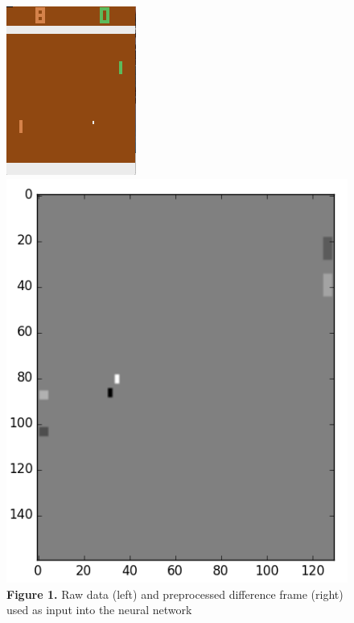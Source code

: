 \documentclass[12pt]{article}
\theoremstyle{plain}
\theoremstyle{definition}
\theoremstyle{remark}
\theoremstyle{plain}
\begin{document}
\begin{figure}[h]
\centering
\includegraphics[scale=.9]{env.png}
\includegraphics[scale=0.5]{df.png}
\newline
\centering
\textbf{Figure 1.} Raw data (left) and preprocessed difference frame (right) used as input into the neural network
\end{figure}
\end{document}
